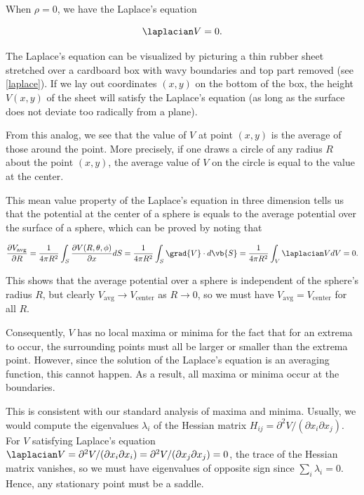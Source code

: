 \documentclass[english,a4paper,12pt]{report}
\begin{document}
When \(\rho = 0\), we have the Laplace's equation

\begin{equation}
    \laplacian V = 0.
\end{equation}

The Laplace's equation can be visualized by picturing a thin rubber sheet stretched over a cardboard box with wavy boundaries and top part removed (see \cref{laplace}). If we lay out coordinates \((x,y)\) on the bottom of the box, the height \(V(x,y)\) of the sheet will satisfy the Laplace's equation (as long as the surface does not deviate too radically from a plane). 

	
From this analog, we see that the value of \(V\) at point \((x,y)\) is the average of those around the point. More precisely, if one draws a circle of any radius \(R\) about the point \((x,y)\), the average value of \(V\) on the circle is equal to the value at the center. 

This mean value property of the Laplace's equation in three dimension tells us that the potential at the center of a sphere is equals to the average potential over the surface of a sphere, which can be proved by noting that 

\begin{equation}
    \frac{\partial V_{\text{avg} } }{\partial R} = \frac{1}{4\pi R^2} \int_{S}^{} \frac{\partial V(R,\theta ,\phi )}{\partial x} dS = \frac{1}{4\pi R^2} \int_{S}^{} \grad{V} \cdot d\vb{S} = \frac{1}{4\pi R^2} \int_{V}^{} \laplacian V dV = 0.     
\end{equation}

This shows that the average potential over a sphere is independent of the sphere's radius \(R\), but clearly \(V_{\text{avg} } \to V_{\text{center} }  \) as \(R \to 0\), so we must have \(V_{\text{avg} } = V_{\text{center} }  \) for all \(R\).   

Consequently, \(V\) has no local maxima or minima for the fact that for an extrema to occur, the surrounding points must all be larger or smaller than the extrema point. However, since the solution of the Laplace's equation is an averaging function, this cannot happen. As a result, all maxima or minima occur at the boundaries.

This is consistent with our standard analysis of maxima and minima. Usually, we would compute the eigenvalues \(\lambda_i\) of the Hessian matrix \(H_{ij} = \partial^2 V / (\partial x_i \partial x_j)\). For \(V\) satisfying Laplace's equation \(\laplacian  V = \partial^2 V / (\partial x_i \partial x_i) = \partial^2 V / (\partial x_j \partial x_j) = 0\), the trace of the Hessian matrix vanishes, so we must have eigenvalues of opposite sign since \(\sum_{i} \lambda_i = 0\). Hence, any stationary point must be a saddle.
\end{document}
